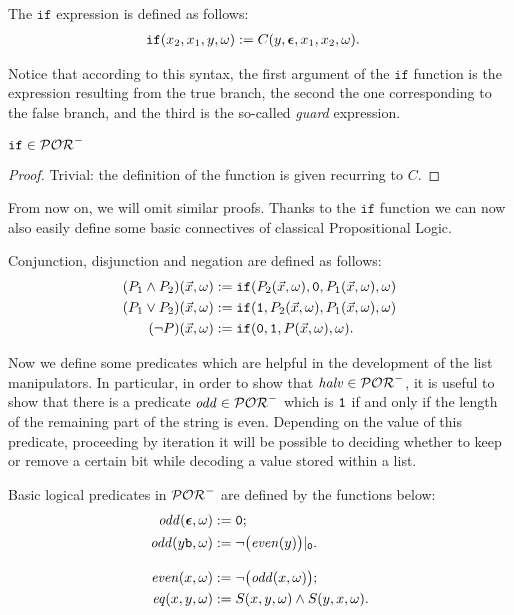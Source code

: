 \begin{defn}[$\mathtt{if}$]
The $\mathtt{if}$ expression is defined as follows:
\begin{align*}
\mathtt{if}(x_2,x_1,y, \omega) &:= C(y, \bm{\epsilon}, x_1, x_2, \omega).
\end{align*}
\end{defn}
\noindent
Notice that according to this syntax, the first argument of the $\mathtt{if}$
function is the
expression resulting from the true branch, the second the one corresponding to the
false branch, and the third is the so-called \emph{guard} expression.
%
%
\begin{remark}
  $\mathtt{if} \in\mathcal{POR}^-$
\end{remark}
\begin{proof}
  Trivial: the definition of the function is given recurring to $C$.
\end{proof}
%
\noindent
From now on, we will omit similar proofs.
Thanks to the $\mathtt{if}$ function we can now
also easily define some basic connectives
of classical Propositional Logic.

\begin{defn}
Conjunction, disjunction and negation are
defined as follows:
\begin{align*}
(P_1\wedge P_2)(\vec{x},\omega) &:=
\mathtt{if}(P_2(\vec{x},\omega),\zero,P_1(\vec{x},\omega),
\omega) \\
%
(P_1\vee P_2)(\vec{x},\omega) &:= \mathtt{if}(\one,
P_2(\vec{x},\omega), P_1(\vec{x},\omega), \omega) \\
%
(\neg P)(\vec{x},\omega) &:= \mathtt{if}(\zero,\one,P(\vec{x},\omega),
\omega).
\end{align*}
\end{defn}

Now we define some predicates which
are helpful in the development of the list manipulators.
In particular, in order to show that $\mathit{halv} \in \mathcal{POR}^-$,
it is useful
to show that there is a predicate $\mathit{odd} \in \mathcal{POR}^-$
which is $\mathtt{1}$ if and only if the length of the remaining
part of the string is even.
Depending on the value of this predicate, proceeding by
iteration it will be possible to deciding whether to keep or remove
a certain bit while decoding a value stored within a list.

\begin{defn}
{Basic logical predicates in $\mathcal{POR}^-$
are defined by the functions below:}
\begin{align*}
\odd(\eepsilon,\omega) &:= \zero; \\
%
\odd(y\bool,\omega) &:= \neg\big(\even(y)\big)|_\zero. \\[2ex]
%
\even(x,\omega) &:= \neg\big(\odd(x,\omega)\big); \\
%
\eq(x, y, \omega) &:= S(x, y, \omega) \land S(y, x, \omega).
\end{align*}
\end{defn}
%
%

